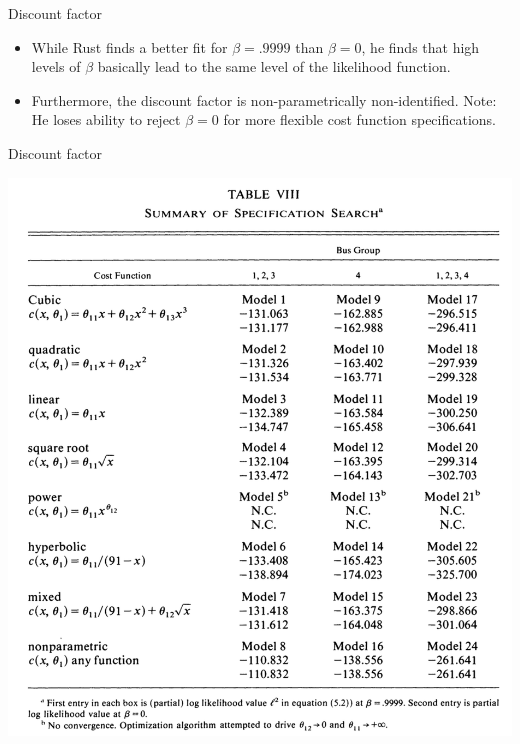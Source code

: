 \documentclass[xcolor=pdftex,dvipsnames,table,mathserif]{beamer}
\begin{document}
\begin{frame}{Discount factor}
\begin{itemize}
	\item While Rust finds a better fit for $\beta=.9999$ than $\beta=0$, he finds that high levels
	of $\beta$ basically lead to the same level of the likelihood function.

	\medskip
	\item Furthermore, the discount factor is non-parametrically non-identified. Note:
	He loses ability to reject $\beta=0$ for more flexible cost function specifications.

\end{itemize}
\end{frame}


\begin{frame}{Discount factor}
\begin{center}
\includegraphics[scale=.25]{./resources/RustT8.png}
\end{center}
\end{frame}
\end{document}

